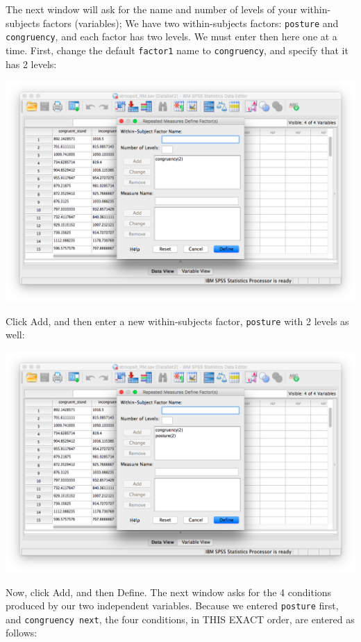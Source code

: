 \documentclass[
]{book}
\begin{document}
The next window will ask for the name and number of levels of your within-subjects factors (variables); We have two within-subjects factors: \texttt{posture} and \texttt{congruency}, and each factor has two levels. We must enter then here one at a time. First, change the default \texttt{factor1} name to \texttt{congruency}, and specify that it has 2 levels:

\includegraphics{img/10.4.25.png}

Click {Add}, and then enter a new within-subjects factor, \texttt{posture} with 2 levels as well:

\includegraphics{img/10.4.26.png}

Now, click {Add}, and then Define. The next window asks for the 4 conditions produced by our two independent variables. Because we entered \texttt{posture} first, and \texttt{congruency\ next}, the four conditions, in THIS EXACT order, are entered as follows:
\end{document}
